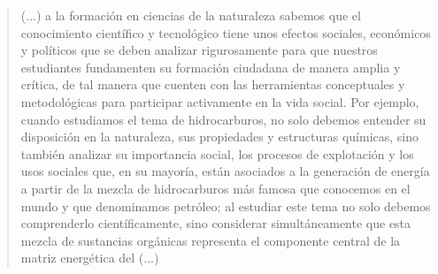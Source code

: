 \documentclass[12pt]{article}
\begin{document}
	\begin{quote}
		(...) a la formación en ciencias de la naturaleza sabemos que el conocimiento científico y tecnológico tiene unos efectos sociales, económicos y políticos que se deben analizar rigurosamente para que nuestros estudiantes fundamenten su formación ciudadana de manera amplia y crítica, de tal manera que cuenten con las herramientas conceptuales y metodológicas para participar activamente en la vida social. Por ejemplo, cuando estudiamos el tema de hidrocarburos, no solo debemos entender su disposición en la naturaleza, sus propiedades y estructuras químicas, sino también analizar su importancia social, los procesos de explotación y los usos sociales que, en su mayoría, están asociados a la generación de energía a partir de la mezcla de hidrocarburos más famosa que conocemos en el mundo y que denominamos petróleo; al estudiar este tema no solo debemos comprenderlo científicamente, sino considerar simultáneamente que esta mezcla de sustancias orgánicas representa el componente central de la matriz energética del (...)
	\end{quote}

	
\end{document}
